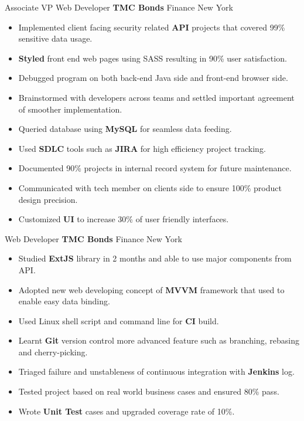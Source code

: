 \documentclass[11pt,a4paper,sans]{moderncv}   %
\begin{document}
{Associate VP Web Developer}
{\textbf{TMC Bonds}}
{Finance}
{New York}
{
  \begin{itemize}
    \item{Implemented client facing security related \textbf{API} projects that covered 99\% sensitive data usage.}
	  \item{\textbf{Styled} front end web pages using SASS resulting in 90\% user satisfaction.}
	  \item{Debugged program on both back-end Java side and front-end browser side.}
	  \item{Brainstormed with developers across teams and settled important agreement of smoother implementation.}
	  \item{Queried database using \textbf{MySQL} for seamless data feeding.}
	  \item{Used \textbf{SDLC} tools such as \textbf{JIRA} for high efficiency project tracking.}
	  \item{Documented 90\% projects in internal record system for future maintenance.}
	  \item{Communicated with tech member on clients side to ensure 100\% product design precision.}
	  \item{Customized \textbf{UI} to increase 30\% of user friendly interfaces.}
	\end{itemize}
}

\cventry{}
{Web Developer}
{\textbf{TMC Bonds}}
{Finance}
{New York}
{
	\begin{itemize}
    \item{Studied \textbf{ExtJS} library in 2 months and able to use major components from API.}
    \item{Adopted new web developing concept of \textbf{MVVM} framework that used to enable easy data binding.}
    \item{Used Linux shell script and command line for \textbf{CI} build.}
    \item{Learnt \textbf{Git} version control more advanced feature such as branching, rebasing and cherry-picking.}
    \item{Triaged failure and unstableness of continuous integration with \textbf{Jenkins} log.}
    \item{Tested project based on real world business cases and ensured 80\% pass.}
    \item{Wrote \textbf{Unit Test} cases and upgraded coverage rate of 10\%.}
	\end{itemize}
}
\end{document}
